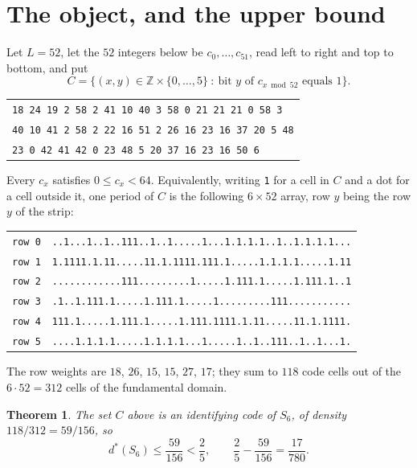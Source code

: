 \documentclass[11pt]{amsart}
\newtheorem{theorem}{Theorem}
\theoremstyle{remark}
\newcommand{\dstar}{d^{*}}
\begin{document}
\section{The object, and the upper bound}\label{sec:bound}

Let $L=52$, let the $52$ integers below be $c_0,\dots,c_{51}$, read left to right and top
to bottom, and put
\[
  C=\bigl\{(x,y)\in\mathbb Z\times\{0,\dots,5\}\ :\ \text{bit } y \text{ of } c_{x \bmod 52}
  \text{ equals } 1\bigr\}.
\]

\begin{center}
\footnotesize
\begin{tabular}{l}
\texttt{18 24 19 2 58 2 41 10 40 3 58 0 21 21 21 0 58 3}\\
\texttt{40 10 41 2 58 2 22 16 51 2 26 16 23 16 37 20 5 48}\\
\texttt{23 0 42 41 42 0 23 48 5 20 37 16 23 16 50 6}
\end{tabular}
\end{center}

\noindent Every $c_x$ satisfies $0\le c_x<64$. Equivalently, writing \texttt{1} for a cell
in $C$ and a dot for a cell outside it, one period of $C$ is the following $6\times52$
array, row $y$ being the row $y$ of the strip:

\begin{center}
\footnotesize
\begin{tabular}{ll}
\texttt{row 0} & \texttt{..1...1..1..111..1..1.....1...1.1.1.1..1..1.1.1.1...}\\
\texttt{row 1} & \texttt{1.1111.1.11.....11.1.1111.111.1.....1.1.1.1.....1.11}\\
\texttt{row 2} & \texttt{............111.........1.....1.111.1.....1.111.1..1}\\
\texttt{row 3} & \texttt{.1..1.111.1.....1.111.1.....1.........111...........}\\
\texttt{row 4} & \texttt{111.1.....1.111.1.....1.111.1111.1.11.....11.1.1111.}\\
\texttt{row 5} & \texttt{....1.1.1.1.....1.1.1.1...1.....1..1..111..1..1...1.}
\end{tabular}
\end{center}

The row weights are $18$, $26$, $15$, $15$, $27$, $17$; they sum to $118$ code cells out of
the $6\cdot52=312$ cells of the fundamental domain.

\begin{theorem}\label{thm:upper}
The set $C$ above is an identifying code of $S_6$, of density $118/312=59/156$, so
\[
  \dstar(S_6)\le\frac{59}{156}<\frac{2}{5},
  \qquad \frac{2}{5}-\frac{59}{156}=\frac{17}{780}.
\]
\end{theorem}
\end{document}
